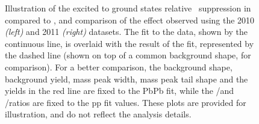 \begin{figure}[hbtp]
  \begin{center}
    \caption{Illustration of the excited to ground states relative \PgU\ suppression in \PbPb compared to \pp, and comparison of the effect observed using the 2010 \emph{(left)} and 2011 \emph{(right)} \PbPb datasets. The fit to the \PbPb data, shown  by the continuous line, is overlaid with the result of the \pp fit, represented by the dashed line (shown on top of a common \PbPb background shape, for comparison).  For a better comparison, the background shape, background yield, mass peak width, mass peak tail shape and the \PgUa yields in the red line are fixed to the PbPb fit, while the \PgUb/\PgUa and \PgUc/\PgUa ratios are fixed to the pp fit values.  These plots are provided for illustration, and do not reflect the analysis details.}
    \label{fig:pr-overlay}
  \end{center}
\end{figure}

